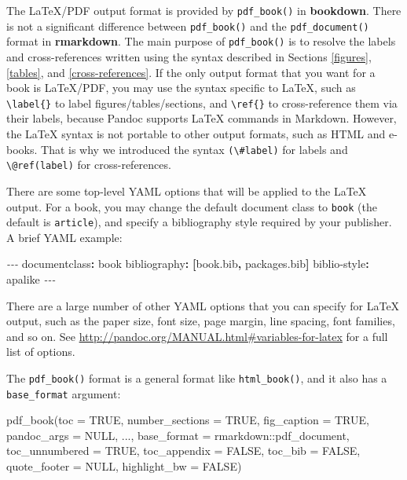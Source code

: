 \documentclass[
  12pt,
]{krantz}
\newenvironment{Shaded}{\begin{snugshade}}{\end{snugshade}}
\newcommand{\AttributeTok}[1]{\textcolor[rgb]{0.77,0.63,0.00}{#1}}
\newcommand{\ConstantTok}[1]{\textcolor[rgb]{0.00,0.00,0.00}{#1}}
\newcommand{\FunctionTok}[1]{\textcolor[rgb]{0.00,0.00,0.00}{#1}}
\newcommand{\KeywordTok}[1]{\textcolor[rgb]{0.13,0.29,0.53}{\textbf{#1}}}
\newcommand{\NormalTok}[1]{#1}
\newcommand{\PreprocessorTok}[1]{\textcolor[rgb]{0.56,0.35,0.01}{\textit{#1}}}
\newcommand{\SpecialCharTok}[1]{\textcolor[rgb]{0.00,0.00,0.00}{#1}}
\theoremstyle{definition}
\theoremstyle{definition}
\theoremstyle{definition}
\theoremstyle{definition}
\theoremstyle{remark}
\begin{document}
The LaTeX/PDF output format is provided by \texttt{pdf\_book()} in \textbf{bookdown}. There is not a significant difference between \texttt{pdf\_book()} and the \texttt{pdf\_document()} format in \textbf{rmarkdown}. The main purpose of \texttt{pdf\_book()} is to resolve the labels and cross-references written using the syntax described in Sections \ref{figures}, \ref{tables}, and \ref{cross-references}. If the only output format that you want for a book is LaTeX/PDF, you may use the syntax specific to LaTeX, such as \texttt{\textbackslash{}label\{\}} to label figures/tables/sections, and \texttt{\textbackslash{}ref\{\}} to cross-reference them via their labels, because Pandoc supports LaTeX commands in Markdown. However, the LaTeX syntax is not portable to other output formats, such as HTML and e-books. That is why we introduced the syntax \texttt{(\textbackslash{}\#label)} for labels and \texttt{\textbackslash{}@ref(label)} for cross-references.

There are some top-level YAML options that will be applied to the LaTeX output. For a book, you may change the default document class to \texttt{book} (the default is \texttt{article}), and specify a bibliography style required by your publisher. A brief YAML example:

\begin{Shaded}
\begin{Highlighting}[]
\PreprocessorTok{{-}{-}{-}}
\FunctionTok{documentclass}\KeywordTok{:}\AttributeTok{ book}
\FunctionTok{bibliography}\KeywordTok{:}\AttributeTok{ }\KeywordTok{[}\AttributeTok{book.bib}\KeywordTok{,}\AttributeTok{ packages.bib}\KeywordTok{]}
\FunctionTok{biblio{-}style}\KeywordTok{:}\AttributeTok{ apalike}
\PreprocessorTok{{-}{-}{-}}
\end{Highlighting}
\end{Shaded}

There are a large number of other YAML options that you can specify for LaTeX output, such as the paper size, font size, page margin, line spacing, font families, and so on. See \url{http://pandoc.org/MANUAL.html\#variables-for-latex} for a full list of options.

The \texttt{pdf\_book()} format is a general format like \texttt{html\_book()}, and it also has a \texttt{base\_format} argument:

\begin{Shaded}
\begin{Highlighting}[]
\FunctionTok{pdf\_book}\NormalTok{(}\AttributeTok{toc =} \ConstantTok{TRUE}\NormalTok{, }\AttributeTok{number\_sections =} \ConstantTok{TRUE}\NormalTok{,}
  \AttributeTok{fig\_caption =} \ConstantTok{TRUE}\NormalTok{, }\AttributeTok{pandoc\_args =} \ConstantTok{NULL}\NormalTok{, ...,}
  \AttributeTok{base\_format =}\NormalTok{ rmarkdown}\SpecialCharTok{::}\NormalTok{pdf\_document,}
  \AttributeTok{toc\_unnumbered =} \ConstantTok{TRUE}\NormalTok{, }\AttributeTok{toc\_appendix =} \ConstantTok{FALSE}\NormalTok{,}
  \AttributeTok{toc\_bib =} \ConstantTok{FALSE}\NormalTok{, }\AttributeTok{quote\_footer =} \ConstantTok{NULL}\NormalTok{,}
  \AttributeTok{highlight\_bw =} \ConstantTok{FALSE}\NormalTok{)}
\end{Highlighting}
\end{Shaded}
\end{document}
